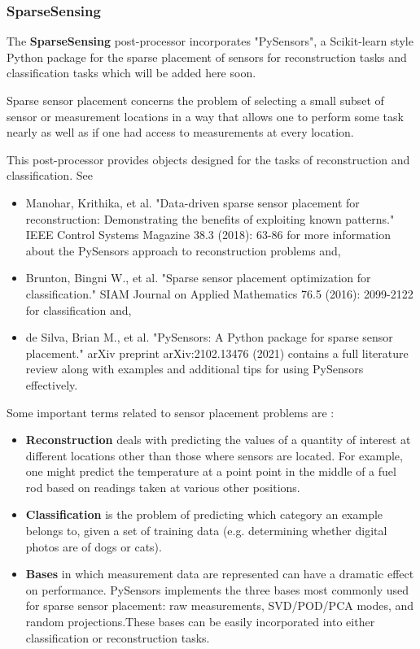 \subsubsection{SparseSensing}
\label{SparseSensing}
The \textbf{SparseSensing} post-processor incorporates "PySensors", a Scikit-learn style Python package for the sparse placement of sensors for reconstruction tasks and classification tasks which will be added here soon.

Sparse sensor placement concerns the problem of selecting a small subset of sensor or measurement locations in a way that allows one to perform some task nearly as well as if one had access to measurements at every location.

This post-processor provides objects designed for the tasks of reconstruction and classification. See

\begin{itemize}
    \item Manohar, Krithika, et al. "Data-driven sparse sensor placement for reconstruction: Demonstrating the benefits of exploiting known patterns." IEEE Control Systems Magazine 38.3 (2018): 63-86 for more information about the PySensors approach to reconstruction problems and,
    \item Brunton, Bingni W., et al. "Sparse sensor placement optimization for classification." SIAM Journal on Applied Mathematics 76.5 (2016): 2099-2122 for classification and,
    \item de Silva, Brian M., et al. "PySensors: A Python package for sparse sensor placement." arXiv preprint arXiv:2102.13476 (2021) contains a full literature review along with examples and additional tips for using PySensors effectively.
\end{itemize} 

Some important terms related to sensor placement problems are : 

\begin{itemize}
    \item \textbf{Reconstruction} deals with predicting the values of a quantity of interest at different locations other than those where sensors are located. For example, one might predict the temperature at a point point in the middle of a fuel rod based on readings taken at various other positions. 

    \item \textbf{Classification} is the problem of predicting which category an example belongs to, given a set of training data (e.g. determining whether digital photos are of dogs or cats).

    \item \textbf{Bases} in which measurement data are represented can have a dramatic effect on performance. PySensors implements the three bases most commonly used for sparse sensor placement: raw measurements, SVD/POD/PCA modes, and random projections.These bases can be easily incorporated into either classification or reconstruction tasks. 
\end{itemize}

